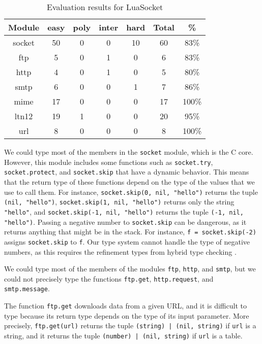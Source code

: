 \begin{table}[!ht]
\begin{center}
\begin{tabular}{|c|c|c|c|c|c|c|}
\hline
\textbf{Module} & \textbf{easy} & \textbf{poly} & \textbf{inter} & \textbf{hard} & \textbf{Total} & \textbf{\%} \\
\hline
socket & 50 & 0 & 0 & 10 & 60 & 83\% \\
\hline
ftp & 5 & 0 & 1 & 0 & 6 & 83\% \\
\hline
http & 4 & 0 & 1 & 0 & 5 & 80\% \\
\hline
smtp & 6 & 0 & 0 & 1 & 7 & 86\% \\
\hline
mime & 17 & 0 & 0 & 0 & 17 & 100\% \\
\hline
ltn12 & 19 & 1 & 0 & 0 & 20 & 95\% \\
\hline
url & 8 & 0 & 0 & 0 & 8 & 100\% \\
\hline
\end{tabular}
\end{center}
\caption{Evaluation results for LuaSocket}
\label{tab:evalsocket}
\end{table}

We could type most of the members in the \texttt{socket} module,
which is the C core.
However, this module includes some functions such as
\texttt{socket.try}, \texttt{socket.protect}, and \texttt{socket.skip}
that have a dynamic behavior.
This means that the return type of these functions depend on the
type of the values that we use to call them.
For instance, \texttt{socket.skip(0, nil, "hello")} returns the
tuple \texttt{(nil, "hello")}, \texttt{socket.skip(1, nil, "hello")}
returns only the string \texttt{"hello"}, and
\texttt{socket.skip(-1, nil, "hello")} returns the tuple
\texttt{(-1, nil, "hello")}.
Passing a negative number to \texttt{socket.skip} can be
dangerous, as it returns anything that might be in the stack.
For instance, \texttt{f = socket.skip(-2)} assigns \texttt{socket.skip}
to \texttt{f}.
Our type system cannot handle the type of negative numbers, as
this requires the refinement types from hybrid type checking \citep{flanagan2006htc}.

We could type most of the members of the modules \texttt{ftp},
\texttt{http}, and \texttt{smtp}, but we could not precisely type
the functions \texttt{ftp.get}, \texttt{http.request}, and
\texttt{smtp.message}.

The function \texttt{ftp.get} downloads data from a given URL,
and it is difficult to type because its return type depends on
the type of its input parameter.
More precisely, \texttt{ftp.get(url)} returns the tuple
\texttt{(string) | (nil, string)} if \texttt{url} is a string,
and it returns the tuple \texttt{(number) | (nil, string)} if
\texttt{url} is a table.

